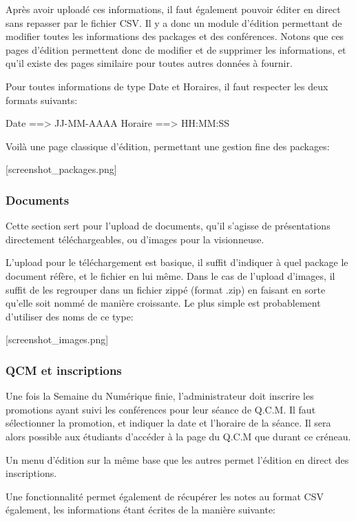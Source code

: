 Après avoir uploadé ces informations, il faut également pouvoir éditer en direct sans repasser par le fichier CSV.
Il y a donc un module d'édition permettant de modifier toutes les informations des packages et des conférences.
Notons que ces pages d'édition permettent donc de modifier et de supprimer les informations, et qu'il existe des pages
similaire pour toutes autres données à fournir.

Pour toutes informations de type Date et Horaires, il faut respecter les deux formats suivants:

Date ==> JJ-MM-AAAA
Horaire ==> HH:MM:SS

Voilà une page classique d'édition, permettant une gestion fine des packages:

[screenshot\_packages.png]

            \subsubsection{Documents}

Cette section sert pour l'upload de documents, qu'il s'agisse de présentations directement téléchargeables, ou d'images pour la visionneuse.

L'upload pour le téléchargement est basique, il suffit d'indiquer à quel package le document réfère, et le fichier en lui même.
Dans le cas de l'upload d'images, il suffit de les regrouper dans un fichier zippé (format .zip) en faisant en sorte qu'elle soit
nommé de manière croissante. Le plus simple est probablement d'utiliser des noms de ce type:

[screenshot\_images.png]

            \subsubsection{QCM et inscriptions}

Une fois la Semaine du Numérique finie, l'administrateur doit inscrire les promotions ayant suivi les conférences pour leur
séance de Q.C.M. Il faut sélectionner la promotion, et indiquer la date et l'horaire de la séance. Il sera alors possible aux étudiants d'accéder à la page du Q.C.M que durant ce créneau.

Un menu d'édition sur la même base que les autres permet l'édition en direct des inscriptions.

Une fonctionnalité permet également de récupérer les notes au format CSV également, les informations étant écrites de la manière suivante:

